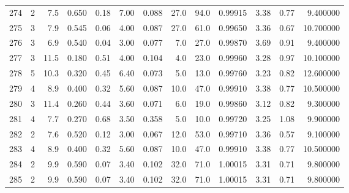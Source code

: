 \begin{tabular}{lrrrrrrrrrrrr}
274  &        2 &            7.5 &             0.650 &         0.18 &            7.00 &      0.088 &                 27.0 &                  94.0 &  0.99915 &  3.38 &       0.77 &   9.400000 \\
275  &        3 &            7.9 &             0.545 &         0.06 &            4.00 &      0.087 &                 27.0 &                  61.0 &  0.99650 &  3.36 &       0.67 &  10.700000 \\
276  &        3 &            6.9 &             0.540 &         0.04 &            3.00 &      0.077 &                  7.0 &                  27.0 &  0.99870 &  3.69 &       0.91 &   9.400000 \\
277  &        3 &           11.5 &             0.180 &         0.51 &            4.00 &      0.104 &                  4.0 &                  23.0 &  0.99960 &  3.28 &       0.97 &  10.100000 \\
278  &        5 &           10.3 &             0.320 &         0.45 &            6.40 &      0.073 &                  5.0 &                  13.0 &  0.99760 &  3.23 &       0.82 &  12.600000 \\
279  &        4 &            8.9 &             0.400 &         0.32 &            5.60 &      0.087 &                 10.0 &                  47.0 &  0.99910 &  3.38 &       0.77 &  10.500000 \\
280  &        3 &           11.4 &             0.260 &         0.44 &            3.60 &      0.071 &                  6.0 &                  19.0 &  0.99860 &  3.12 &       0.82 &   9.300000 \\
281  &        4 &            7.7 &             0.270 &         0.68 &            3.50 &      0.358 &                  5.0 &                  10.0 &  0.99720 &  3.25 &       1.08 &   9.900000 \\
282  &        2 &            7.6 &             0.520 &         0.12 &            3.00 &      0.067 &                 12.0 &                  53.0 &  0.99710 &  3.36 &       0.57 &   9.100000 \\
283  &        4 &            8.9 &             0.400 &         0.32 &            5.60 &      0.087 &                 10.0 &                  47.0 &  0.99910 &  3.38 &       0.77 &  10.500000 \\
284  &        2 &            9.9 &             0.590 &         0.07 &            3.40 &      0.102 &                 32.0 &                  71.0 &  1.00015 &  3.31 &       0.71 &   9.800000 \\
285  &        2 &            9.9 &             0.590 &         0.07 &            3.40 &      0.102 &                 32.0 &                  71.0 &  1.00015 &  3.31 &       0.71 &   9.800000 \\

\end{tabular}
